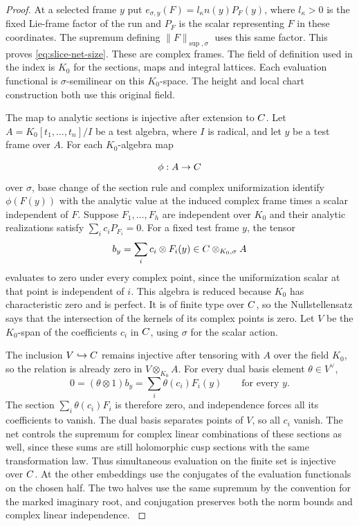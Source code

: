 \begin{proof}
At a selected frame \(y\) put
\(e_{\sigma,y}(F)=l_\kappa n(y)P_F(y)\), where
\(l_\kappa>0\) is the fixed Lie-frame factor of the
run and \(P_F\) is the scalar representing \(F\) in these coordinates. The supremum defining
\(\|F\|_{\sup,\sigma}\) uses this same factor. This proves
\eqref{eq:slice-net-size}. These are complex frames. The
field of definition used in the index is \(K_0\) for the
sections, maps and integral lattices. Each evaluation functional is \(\sigma\)-semilinear on this \(K_0\)-space. The height and
local chart construction both use this original field.

The map to analytic sections is injective after extension to
\(C\). Let \(A=K_0[t_1,\ldots,t_n]/I\) be a test
algebra, where \(I\) is radical, and let \(y\) be a test
frame over \(A\). For each \(K_0\)-algebra map

\[
  \phi:A\to C
\]
 over \(\sigma\), base change of the
section rule and complex uniformization identify
\(\phi(F(y))\) with the analytic value at the induced complex frame times a scalar independent of \(F\).
Suppose \(F_1,\ldots,F_h\) are independent over \(K_0\)
and their analytic realizations satisfy \(\sum_i c_iP_{F_i}=0\).
For a fixed test frame \(y\), the tensor
\[
                    b_y=\sum_i c_i\otimes F_i(y)
                    \in C\otimes_{K_0,\sigma} A
\]
evaluates to zero under every complex point, since the
uniformization scalar at that point is independent of \(i\). This
algebra is reduced because \(K_0\) has characteristic
zero and is perfect. It is of finite type over \(C\), so
the Nullstellensatz says that the intersection of the
kernels of its complex points is zero. \cite{test-algebra-base-change}
Let \(V\) be the \(K_0\)-span of the coefficients \(c_i\) in
\(C\), using \(\sigma\) for the scalar action.

The inclusion
\(V\hookrightarrow C\) remains injective after tensoring with
\(A\) over the field \(K_0\), so the relation is already zero
in \(V\otimes_{K_0}A\). For every dual basis element \(\theta\in V^\vee\),
\[
          0=(\theta\otimes1)b_y=\sum_i\theta(c_i)F_i(y)
                                  \qquad\text{for every }y.
\]
The section \(\sum_i\theta(c_i)F_i\) is therefore zero,
and independence forces all its coefficients to vanish. The dual basis separates
points of \(V\), so all \(c_i\) vanish.
The net controls the supremum for complex linear combinations of these sections as well, since these sums are still holomorphic
cusp sections with the same transformation law. Thus simultaneous evaluation on the finite set is injective over \(C\). At the other
embeddings use the conjugates of the evaluation functionals on the chosen half.
The two halves use the same supremum by the convention for
the marked imaginary root, and conjugation preserves both
the norm bounds and complex linear independence. \label{cor:slice-evaluation-net-6}

\end{proof}

